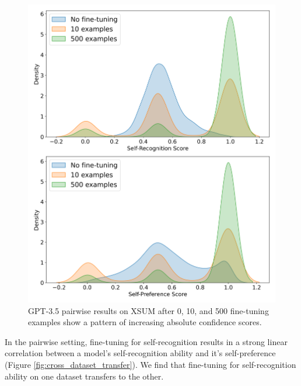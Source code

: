 \documentclass{article}
\theoremstyle{plain}
\theoremstyle{definition}
\theoremstyle{remark}
\begin{document}
\begin{figure} \centering
\includegraphics[width=\columnwidth]{images/confidence_density_distribution.png}
\caption{GPT-3.5 pairwise results on XSUM after 0, 10, and 500 fine-tuning examples show a pattern of increasing absolute confidence scores. }
\label{fig:confidence_distributions}
\end{figure}

In the pairwise setting, fine-tuning for self-recognition results in a strong linear correlation between a model's self-recognition ability and it's self-preference (Figure \ref{fig:cross_dataset_transfer}). We find that fine-tuning for self-recognition ability on one dataset transfers to the other.
\end{document}
